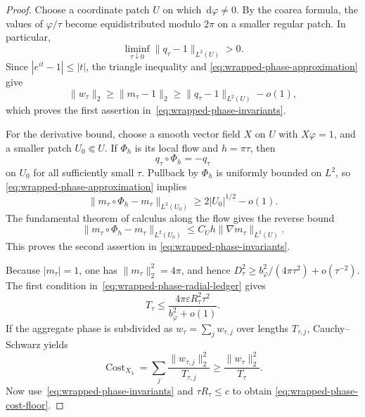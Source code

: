 \documentclass[11pt]{article}
\theoremstyle{remark}
\newcommand{\dd}{\,\mathrm d}
\begin{document}
\begin{proof}
Choose a coordinate patch $U$ on which $\dd\varphi\neq0$.  By the coarea
formula, the values of $\varphi/\tau$ become equidistributed modulo $2\pi$
on a smaller regular patch.  In particular,
\[
 \liminf_{\tau\downarrow0}\|q_\tau-1\|_{L^2(U)}>0.
\]
Since $|e^{it}-1|\leq|t|$, the triangle inequality and
\eqref{eq:wrapped-phase-approximation} give
\[
 \|w_\tau\|_2
 \geq\|m_\tau-1\|_2
 \geq\|q_\tau-1\|_{L^2(U)}-o(1),
\]
which proves the first assertion in~\eqref{eq:wrapped-phase-invariants}.

For the derivative bound, choose a smooth vector field $X$ on $U$ with
$X\varphi=1$, and a smaller patch $U_0\Subset U$.  If $\Phi_h$ is its local
flow and $h=\pi\tau$, then
\[
 q_\tau\circ\Phi_h=-q_\tau
\]
on $U_0$ for all sufficiently small $\tau$.  Pullback by $\Phi_h$ is
uniformly bounded on $L^2$, so
\eqref{eq:wrapped-phase-approximation} implies
\[
 \|m_\tau\circ\Phi_h-m_\tau\|_{L^2(U_0)}
 \geq 2|U_0|^{1/2}-o(1).
\]
The fundamental theorem of calculus along the flow gives the reverse bound
\[
 \|m_\tau\circ\Phi_h-m_\tau\|_{L^2(U_0)}
 \leq C_Uh\|\nabla m_\tau\|_{L^2(U)}.
\]
This proves the second assertion in
\eqref{eq:wrapped-phase-invariants}.

Because $|m_\tau|=1$, one has $\|m_\tau\|_2^2=4\pi$, and hence
$D_\tau^2\geq b_\varphi^2/(4\pi\tau^2)+o(\tau^{-2})$.
The first condition in~\eqref{eq:wrapped-phase-radial-ledger} gives
\[
 T_\tau
 \leq
 \frac{4\pi\varepsilon R_\tau^2\tau^2}
 {b_\varphi^2+o(1)}.
\]
If the aggregate phase is subdivided as
$w_\tau=\sum_jw_{\tau,j}$ over lengths $T_{\tau,j}$, Cauchy--Schwarz yields
\[
 \operatorname{Cost}_{X_3}
 =
 \sum_j\frac{\|w_{\tau,j}\|_2^2}{T_{\tau,j}}
 \geq
 \frac{\|w_\tau\|_2^2}{T_\tau}.
\]
Now use~\eqref{eq:wrapped-phase-invariants} and
$\tau R_\tau\leq c$ to obtain
\eqref{eq:wrapped-phase-cost-floor}.
\end{proof}

\iffalse
\end{document}
